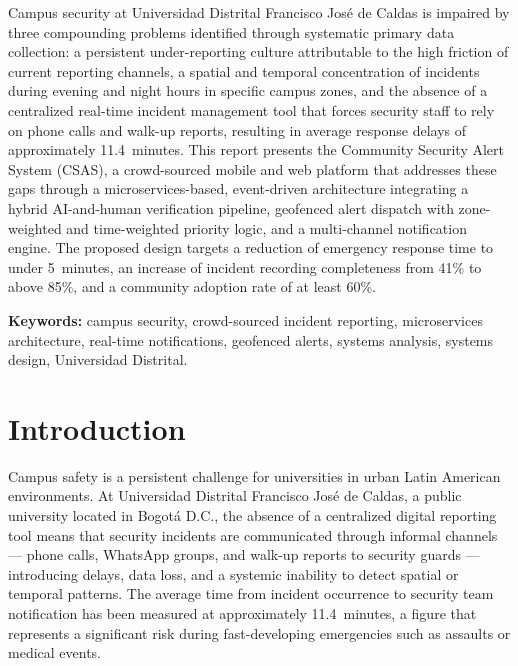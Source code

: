 \documentclass[12pt, oneside]{article}
\begin{document}
Campus security at Universidad Distrital Francisco Jos\'e de Caldas is impaired by
three compounding problems identified through systematic primary data collection:
a persistent under-reporting culture attributable to the high friction of current
reporting channels, a spatial and temporal concentration of incidents during evening
and night hours in specific campus zones, and the absence of a centralized real-time
incident management tool that forces security staff to rely on phone calls and walk-up
reports, resulting in average response delays of approximately 11.4~minutes. This
report presents the Community Security Alert System (CSAS), a crowd-sourced
mobile and web platform that addresses these gaps through a microservices-based,
event-driven architecture integrating a hybrid AI-and-human verification pipeline,
geofenced alert dispatch with zone-weighted and time-weighted priority logic, and a
multi-channel notification engine. The proposed design targets a reduction of emergency
response time to under 5~minutes, an increase of incident recording completeness
from 41\% to above 85\%, and a community adoption rate of at least 60\%.

\vspace{6pt}
\noindent\textbf{Keywords:} campus security, crowd-sourced incident reporting,
microservices architecture, real-time notifications, geofenced alerts,
systems analysis, systems design, Universidad Distrital.

\newpage
\tableofcontents
\newpage
\listoffigures
{}
\listoftables
{}
\newpage

\setcounter{page}{1}

\section{Introduction}

Campus safety is a persistent challenge for universities in urban Latin American
environments. At Universidad Distrital Francisco Jos\'e de Caldas, a public university
located in Bogot\'a D.C., the absence of a centralized digital reporting tool means that
security incidents are communicated through informal channels --- phone calls,
WhatsApp groups, and walk-up reports to security guards --- introducing delays, data
loss, and a systemic inability to detect spatial or temporal patterns. The average time
from incident occurrence to security team notification has been measured at approximately
11.4~minutes, a figure that represents a significant risk during fast-developing
emergencies such as assaults or medical events.
\end{document}
